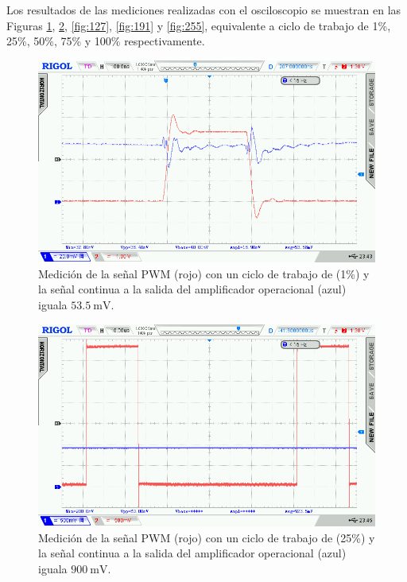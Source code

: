 Los resultados de las mediciones realizadas con el osciloscopio se muestran en las Figuras \ref{fig:1}, \ref{fig:63}, \ref{fig:127}, \ref{fig:191} y \ref{fig:255}, equivalente a ciclo de trabajo de 1\%, 25\%, 50\%, 75\% y 100\% respectivamente.



\begin{figure}[H]
    \centering
    \includegraphics[width=0.9\linewidth]{Figuras/datalogger/Hardware/MedicionesPWM/1.png}
    \caption{Medición de la señal PWM (rojo) con un ciclo de trabajo de (1\%) y la señal continua a la salida del amplificador operacional (azul) iguala $\SI{53.5}{\milli\volt}$.}
    \label{fig:1}
\end{figure}

\begin{figure}[H]
    \centering
    \includegraphics[width=0.9\linewidth]{Figuras/datalogger/Hardware/MedicionesPWM/63.png}
    \caption{Medición de la señal PWM (rojo) con un ciclo de trabajo de (25\%) y la señal continua a la salida del amplificador operacional (azul) iguala $\SI{900}{\milli\volt}$.}
    \label{fig:63}
\end{figure}


